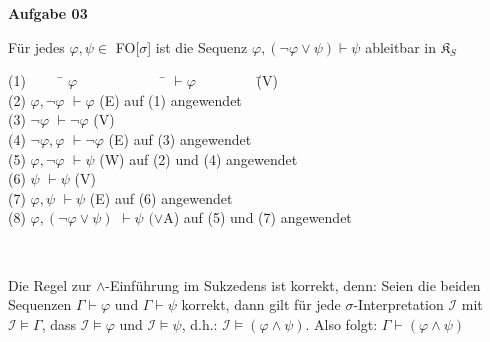\documentclass[a4paper,10pt]{article}
\begin{document}
	\newpage
	\textbf{Aufgabe 03}
	\begin{compactenum} [(a)]
		\item Für jedes $ \varphi, \psi \in $ FO$[ \sigma $] ist die Sequenz $ \varphi, (\lnot \varphi \vee \psi ) \vdash \psi $ ableitbar in $ \mathfrak{K}_S $
		\begin{tabbing}
			(1) $ \qquad $ \= $ \varphi \qquad \qquad \qquad $ \= $\vdash \varphi \qquad \qquad $ \= (V)\\
			(2) \> $ \varphi, \lnot \varphi $ \> $\vdash \varphi $ \> (E) auf (1) angewendet \\
			(3) \> $ \lnot \varphi $ \> $ \vdash \lnot \varphi $ \> (V)\\
			(4) \> $ \lnot \varphi, \varphi $ \> $ \vdash \lnot \varphi $ \> (E) auf (3) angewendet\\
			(5) \> $ \varphi, \lnot \varphi $ \> $ \vdash \psi $ \> (W) auf (2) und (4) angewendet\\
			(6) \>$ \psi $ \> $ \vdash \psi $ \> (V)\\
			(7) \>$ \varphi, \psi $ \> $ \vdash \psi $ \> (E) auf (6) angewendet\\
			(8) \> $ \varphi, (\lnot \varphi \vee \psi) $ \> $ \vdash \psi $ \>$ (\vee $A) auf (5) und (7) angewendet
		\end{tabbing}\
		
		\item Die Regel zur $ \wedge $-Einführung im Sukzedens ist korrekt, denn: Seien die beiden Sequenzen $ \Gamma \vdash \varphi $  und $ \Gamma \vdash \psi $ korrekt, dann gilt für jede $ \sigma $-Interpretation $ \mathcal{I} $ mit $ \mathcal{I} \models \Gamma $, dass $ \mathcal{I} \models \varphi $ und $ \mathcal{I} \models \psi $, d.h.: $ \mathcal{I} \models (\varphi \wedge \psi) $. Also folgt: $ \Gamma \vdash (\varphi \wedge \psi) $
	\end{compactenum}
\end{document}
